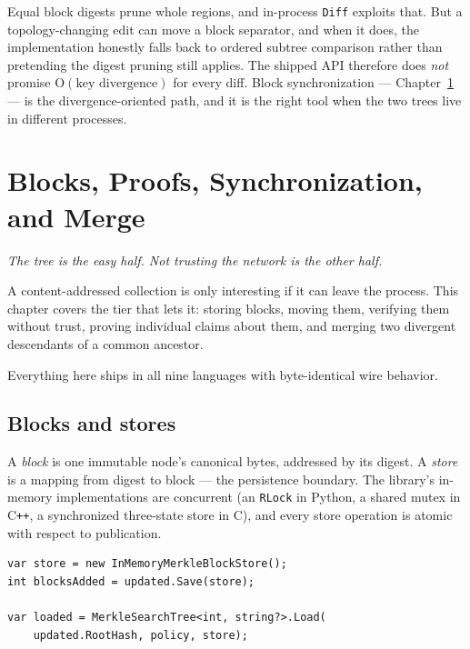 \documentclass[11pt,twoside,openright]{book}
\newcommand{\code}[1]{\texorpdfstring{\textcolor{d7ink}{\texttt{#1}}}{#1}}
\newcommand{\term}[1]{\textit{#1}}
\newcommand{\bigoh}[1]{$\mathrm{O}(#1)$}
\newcommand{\motto}[1]{%
  \begingroup
  \vspace{-4pt}\hfill\begin{minipage}{0.80\textwidth}
    \raggedleft\itshape\color{d7slate}\small #1\par
  \end{minipage}\par\vspace{18pt}
  \endgroup}
\begin{document}
\begin{caveatbox}
Equal block digests prune whole regions, and in-process \code{Diff} exploits
that. But a topology-changing edit can move a block separator, and when it does,
the implementation honestly falls back to ordered subtree comparison rather than
pretending the digest pruning still applies. The shipped API therefore does
\emph{not} promise \bigoh{\text{key divergence}} for every diff. Block
synchronization --- Chapter~\ref{ch:merkleops} --- is the divergence-oriented
path, and it is the right tool when the two trees live in different processes.
\end{caveatbox}

\chapter{Blocks, Proofs, Synchronization, and Merge}
\label{ch:merkleops}

\motto{The tree is the easy half. Not trusting the network is the other half.}

\noindent
A content-addressed collection is only interesting if it can leave the process.
This chapter covers the tier that lets it: storing blocks, moving them,
verifying them without trust, proving individual claims about them, and merging
two divergent descendants of a common ancestor.

Everything here ships in all nine languages with byte-identical wire behavior.

\section{Blocks and stores}

A \term{block} is one immutable node's canonical bytes, addressed by its digest.
A \term{store} is a mapping from digest to block --- the persistence boundary.
The library's in-memory implementations are concurrent (an \code{RLock} in
Python, a shared mutex in C\texttt{++}, a synchronized three-state store in C),
and every store operation is atomic with respect to publication.

\begin{lstlisting}[language={[Sharp]C}]
var store = new InMemoryMerkleBlockStore();
int blocksAdded = updated.Save(store);

var loaded = MerkleSearchTree<int, string?>.Load(
    updated.RootHash, policy, store);
\end{lstlisting}
\end{document}

